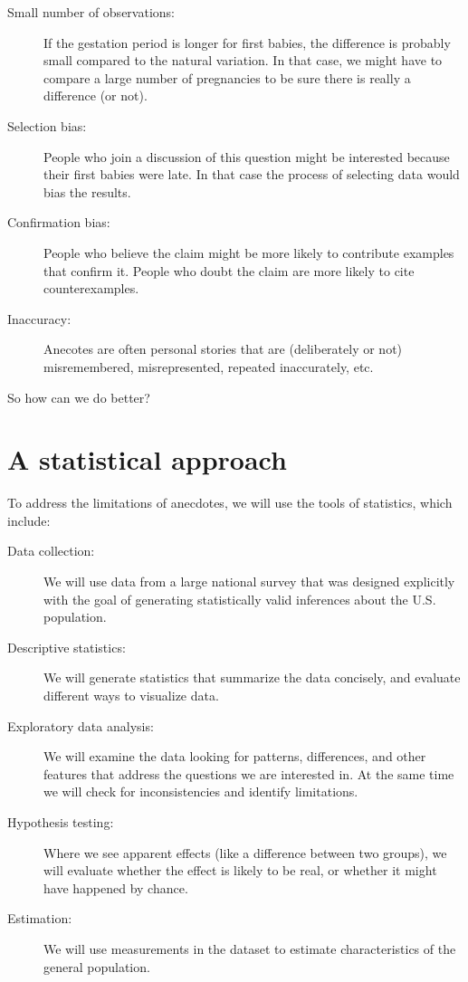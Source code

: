 \documentclass[10pt]{book}
\begin{document}
\begin{description}

\item[Small number of observations:] If the gestation period is longer
  for first babies, the difference is probably small compared to the
  natural variation.  In that case, we might have to compare a large
  number of pregnancies to be sure there is really a difference (or
  not).

\item[Selection bias:] People who join a discussion of this question
  might be interested because their first babies were late.  In that
  case the process of selecting data would bias the results.

\item[Confirmation bias:] People who believe the claim might be more
  likely to contribute examples that confirm it.  People who doubt the
  claim are more likely to cite counterexamples.

\item[Inaccuracy:] Anecotes are often personal stories that are
  (deliberately or not) misremembered, misrepresented, repeated
  inaccurately, etc.

\end{description}

So how can we do better?

\section{A statistical approach}

To address the limitations of anecdotes, we will use the tools
of statistics, which include:

\begin{description}

\item[Data collection:] We will use data from a large national survey
  that was designed explicitly with the goal of generating
  statistically valid inferences about the U.S. population.

\item[Descriptive statistics:] We will generate statistics that
  summarize the data concisely, and evaluate different ways to
  visualize data.

\item[Exploratory data analysis:] We will examine the data looking for
  patterns, differences, and other features that address the questions
  we are interested in.  At the same time we will check for
  inconsistencies and identify limitations.

\item[Hypothesis testing:] Where we see apparent effects (like a
  difference between two groups), we will evaluate whether the effect
  is likely to be real, or whether it might have happened by chance.

\item[Estimation:] We will use measurements in the dataset to estimate
  characteristics of the general population.

\end{description}
\end{document}
